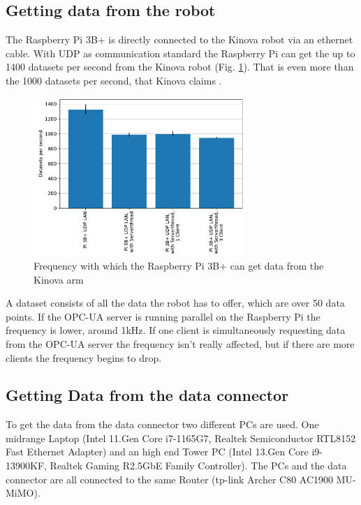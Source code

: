 \documentclass[conference]{IEEEtran}
\begin{document}
\subsection{Getting data from the robot}
The Raspberry Pi 3B+ is directly connected to the Kinova robot via an ethernet cable.
With UDP as communication standard the Raspberry Pi can get the up to 1400 datasets per second from the Kinova robot (Fig. \ref{fig:KortexAPISpeed}).
That is even more than the 1000 datasets per second, that Kinova claims \cite{KortexUDP}.\\

\begin{figure}[htbp]
    \centerline{\includegraphics[width=8cm]{Pictures/KortexAPISpeed.pdf}}
    \caption{Frequency with which the Raspberry Pi 3B+ can get data from the Kinova arm}
    \label{fig:KortexAPISpeed}
\end{figure}
A dataset consists of all the data the robot has to offer, which are over 50 data points.
If the OPC-UA server is running parallel on the Raspberry Pi the frequency is lower, around 1kHz.
If one client is simultaneously requesting data from the OPC-UA server the frequency isn't really affected, but if there are more clients the frequency begins to drop.
\subsection{Getting Data from the data connector}
To get the data from the data connector two different PCs are used. One midrange Laptop (Intel 11.Gen Core i7-1165G7, Realtek Semiconductor
RTL8152 Fast Ethernet Adapter) and an high end Tower PC (Intel 13.Gen Core i9-13900KF, Realtek Gaming R2.5GbE Family Controller).
The PCs and the data connector are all connected to the same Router (tp-link Archer C80 AC1900 MU-MiMO).\\
\end{document}
